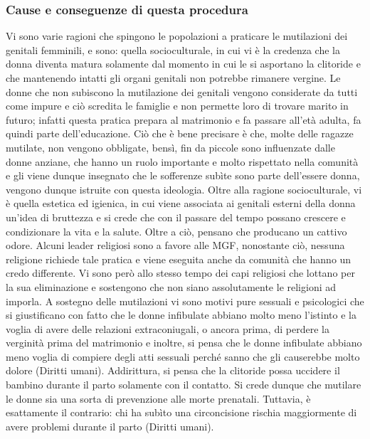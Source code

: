 
\subsubsection{Cause e conseguenze di questa procedura}

Vi sono varie ragioni che spingono le popolazioni a praticare le mutilazioni dei genitali femminili, e sono: quella socioculturale, in cui vi è la credenza che la donna diventa matura solamente dal momento in cui le si asportano la clitoride e che mantenendo intatti gli organi genitali non potrebbe rimanere vergine. Le donne che non subiscono la mutilazione dei genitali vengono considerate da tutti come impure e ciò scredita le famiglie e non permette loro di trovare marito in futuro; infatti questa pratica prepara al matrimonio e fa passare all’età adulta, fa quindi parte dell’educazione. Ciò che è bene precisare è che, molte delle ragazze mutilate, non vengono obbligate, bensì, fin da piccole sono influenzate dalle donne anziane, che hanno un ruolo importante e molto rispettato nella comunità e gli viene dunque insegnato che le sofferenze subìte sono parte dell’essere donna, vengono dunque istruite con questa ideologia. 
Oltre alla ragione socioculturale, vi è quella estetica ed igienica, in cui viene associata ai genitali esterni della donna un’idea di bruttezza e si crede che con il passare del tempo possano crescere e condizionare la vita e la salute. Oltre a ciò, pensano che producano un cattivo odore. Alcuni leader religiosi sono a favore alle MGF, nonostante ciò, nessuna religione richiede tale pratica e viene eseguita anche da comunità che hanno un credo differente. Vi sono però allo stesso tempo dei capi religiosi che lottano per la sua eliminazione e sostengono che non siano assolutamente le religioni ad imporla. A sostegno delle mutilazioni vi sono motivi pure sessuali e psicologici che si giustificano con fatto che le donne infibulate abbiano molto meno l’istinto e la voglia di avere delle relazioni extraconiugali, o ancora prima, di perdere la verginità prima del matrimonio e inoltre, si pensa che le donne infibulate abbiano meno voglia di compiere degli atti sessuali perché sanno che gli causerebbe molto dolore (Diritti umani). 
Addirittura, si pensa che la clitoride possa uccidere il bambino durante il parto solamente con il contatto. Si crede dunque che mutilare le donne sia una sorta di prevenzione alle morte prenatali. Tuttavia, è esattamente il contrario: chi ha subìto una circoncisione rischia maggiormente di avere problemi durante il parto (Diritti umani).

